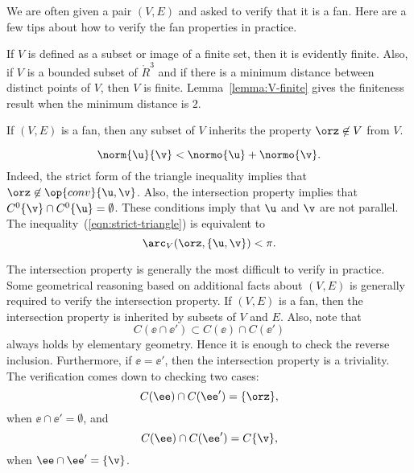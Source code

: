 \begin{remark}\label{remark:fan-verify}  
We are often given a pair $(V,E)$ and asked to verify
that it is a fan.  Here are a few tips about how to verify the fan
properties in practice.
\begin{description} 
\item {} If $V$ is defined as a subset or image of a
finite set, then it is evidently finite.  Also, if $V$ is a bounded
subset of $\ring{R}^3$ and if there is a minimum distance between
distinct points of $V$, then $V$ is finite.
Lemma~\ref{lemma:V-finite} gives the finiteness result when the
minimum distance is $2$.\vspace{6pt}
\item {} If $(V,E)$ is a fan, then any subset of $V$
inherits the property $\orz\not\in V$ from $V$.  \vspace{6pt}
\item {} 
\begin{equation}\label{eqn:strict-triangle}
\norm{\u}{\v} < \normo{\u} + \normo{\v}.
\end{equation}
Indeed, the strict form of the triangle inequality implies that
$\orz\not\in \op{conv}\{\u,\v\}$.  Also, the intersection property
implies that $C^0\{\v\} \cap C^0\{\u\} = \emptyset$.  These conditions
imply that $\u$ and $\v$ are not parallel.  The inequality~(\ref{eqn:strict-triangle})
is equivalent to
\begin{displaymath}
\arc_V(\orz,\{\u,\v\}) < \pi.
\end{displaymath}
\item {} The intersection property is generally the
most difficult to verify in practice.  Some geometrical reasoning
based on additional facts about $(V,E)$ is generally required to
verify the intersection property.  If $(V,E)$ is a fan, then the
intersection property is inherited by subsets of $V$ and $E$.  Also,
note that
\begin{displaymath}
C(\ee\cap \ee') \subset C(\ee) \cap C(\ee')
\end{displaymath}
always holds by elementary geometry.  Hence it is enough to check the
reverse inclusion.  Furthermore, if $\ee = \ee'$, then the
intersection property is a triviality.  The verification comes down to
checking two cases:
\begin{displaymath}
C(\ee) \cap C(\ee') = \{\orz\},
\end{displaymath}
when $\ee\cap \ee' = \emptyset$, and
\begin{displaymath}
C(\ee)\cap C(\ee') = C\{\v\},
\end{displaymath}
when $\ee\cap \ee' = \{\v\}$.
\end{description}
\end{remark}

